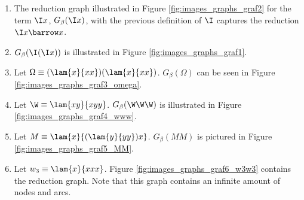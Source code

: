 \begin{example}
	\begin{enumerate}
		\item The reduction graph illustrated in Figure \ref{fig:images_graphs_graf2}
		for the term $\I x$, $G_\beta(\I x)$, with
		the previous definition of $\I$ captures the reduction $\I x\barrow x$.
		
		\item $G_\beta(\I(\I x))$ is illustrated in Figure \ref{fig:images_graphs_graf1}.
		
		\item Let $\Omega\equiv(\lam{x}{xx})(\lam{x}{xx})$. $G_\beta(\Omega)$
		can be seen in Figure \ref{fig:images_graphs_graf3_omega}.
		
		\item Let $\W\equiv\lam{xy}{xyy}$. $G_\beta(\W\W\W)$ is illustrated in
		Figure \ref{fig:images_graphs_graf4_www}.
		
		\item Let $M\equiv\lam{x}{(\lam{y}{yy})x}$. $G_\beta(MM)$ is pictured in
		Figure \ref{fig:images_graphs_graf5_MM}.
		
		\item Let $w_3\equiv\lam{x}{xxx}$. Figure \ref{fig:images_graphs_graf6_w3w3}
		contains the reduction graph. Note that this graph contains an infinite 
		amount of nodes and arcs.
		

\end{enumerate}
\end{example}
